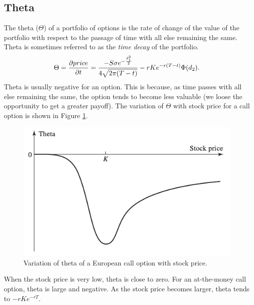 \subsection{Theta}
The theta ($\Theta$) of a portfolio of options is the rate of change of the value of the portfolio with respect to the passage of time with all else remaining the same. Theta is sometimes referred to as the \emph{time decay} of the portfolio.
\begin{equation}
    \Theta = \pdv{price}{t} = \dfrac{-S\sigma e^{-\frac{d_1^2}{2}}}{4\sqrt{2\pi(T-t)}}-rKe^{-r(T-t)}\Phi(d_2).
\end{equation}
Theta is usually negative for an option. This is because, as time passes with all else remaining the same, the option tends to become less valuable (we loose the opportunity to get a greater payoff). The variation of $\Theta$ with stock price for a call option is shown in Figure \ref{fig:theta}.
\begin{figure}[htp]
    \centering
    \includegraphics[scale=0.2]{fig/tmp/fig16.png}
    \caption{Variation of theta of a European call option with stock price.}
    \label{fig:theta}
\end{figure}
\newline When the stock price is very low, theta is close to zero. For an at-the-money call option, theta is large and negative. As the stock price becomes larger, theta tends to $-rKe^{-rT}$.

